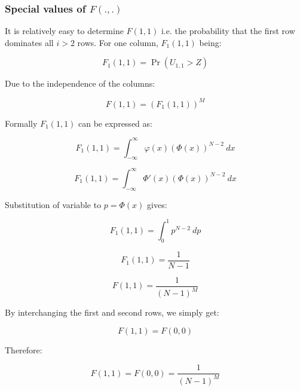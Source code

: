 \documentclass{article}
\theoremstyle{definition}
\begin{document}
\subsubsection{Special values of $F(.,.)$}

It is relatively easy to determine $F(1,1)$ i.e. the probability that the first row dominates all $i>2$ rows. For one column, $F_1(1,1)$ being:

\begin{equation}
    F_1(1,1) = \Pr(U_{1,1} > Z )
\end{equation}

Due to the independence of the columns:

\begin{equation}
    F(1,1) 
    =
    \left ( F_1(1,1) \right )^M
\end{equation}

Formally $F_1(1,1)$ can be expressed as:

\begin{equation}
    F_1(1,1) = 
    \int_{-\infty}^\infty \varphi(x) (\Phi(x))^{N-2} \ d x
\end{equation}

\begin{equation}
    F_1(1,1) = 
    \int_{-\infty}^\infty \Phi'(x) (\Phi(x))^{N-2} \ d x
\end{equation}

Substitution of variable to $p=\Phi(x)$ gives:

\begin{equation}
    F_1(1,1) = 
    \int_{0}^1 p^{N-2} \ d p
\end{equation}

\begin{equation}
    F_1(1,1) = 
    \frac{1}{N-1}
\end{equation}

\begin{equation}
    F(1,1) = 
    \frac{1}{(N-1)^M}
\end{equation}

By interchanging the first and second rows, we simply get:

\begin{equation}
    F(1,1) =  F(0,0)
\end{equation}

Therefore:

\begin{equation}
    F(1,1) =  F(0,0) = \frac{1}{(N-1)^M}
\end{equation}
\end{document}
